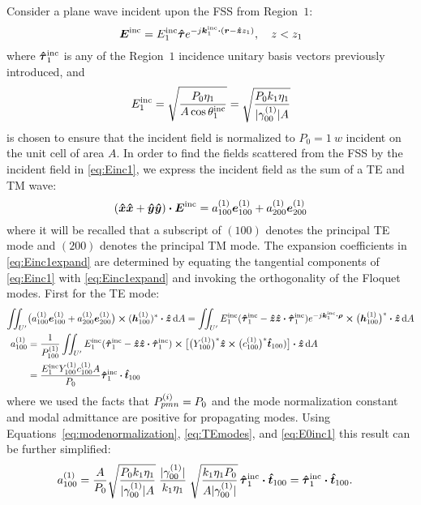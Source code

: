 Consider a plane wave incident upon the FSS from Region~$1$:
\begin{equation}
  \E\inc = E_1\inc \tauhat e^{-j\k_1\inc \bdot (\r - \z z_1)}, \quad z<z_1
  \label{eq:Einc1}
\end{equation}
where $\tauhat_1\inc$ is any of the Region~$1$ incidence unitary basis vectors previously introduced, and
\begin{equation}
  \label{eq:E0inc1}
  E_1^{\text{inc}} = \sqrt{\frac{P_0 \eta_1}{A \cos\theta_1^{\text{inc}}} } = \sqrt{\frac{P_0 k_1\eta_1}{\lvert\gamma_{00}^{(1)}\rvert A}}
\end{equation}
is chosen to ensure that the incident field is normalized to $P_0 = \SI{1}{w}$ incident on the unit
cell of area $A$.
In order to find the fields scattered from the FSS by the incident
field in \eqref{eq:Einc1}, we express the incident field as the sum of
a TE and TM wave:
\begin{equation}
  (\boldsymbol{\hat{x}}\boldsymbol{\hat{x}}+\boldsymbol{\hat{y}}\boldsymbol{\hat{y}}) \boldsymbol{\cdot} \boldsymbol{E}^{\text{inc}} = a_{100}^{(1)} \boldsymbol{e}^{(1)}_{100} + a_{200}^{(1)} \boldsymbol{e}^{(1)}_{200}
  \label{eq:Einc1expand}
\end{equation}
where it will be recalled that a subscript of $(100)$ denotes the
principal TE mode and $(200)$ denotes the principal TM mode.
The expansion coefficients in \eqref{eq:Einc1expand} are determined
by equating the tangential components of \eqref{eq:Einc1} with \eqref{eq:Einc1expand} and
invoking the orthogonality of the Floquet modes.  First for the TE mode:
\begin{align}
  \iint_{U'} & \bigl(a_{100}\one \e\one_{100} + a_{200}\one \e\one_{200}\bigr) \cross
  (\h\one_{100})^* \bdot \z \, \d A 
  =
  \iint_{U'} E_1\inc (\tauhat_1\inc - \z\z\bdot\tauhat_1\inc) e^{-j\k_1\inc \bdot \vecrho} \cross
  \bigl(\h\one_{100}\bigr)^* \bdot \z \, \d A \nonumber \\
   a\one_{100} &= \frac{1}{P\one_{100}}
  \iint_{U'} E_1\inc (\tauhat_1\inc - \z\z\bdot\tauhat_1\inc) \cross 
  \bigl[
    \bigl(Y\one_{100}\bigr)^* 
    \z \cross \bigl(c\one_{100}\bigr)^* \t_{100})
                            \bigr] \bdot \z \, \d A  \nonumber \\
  &= \frac{E_1\inc Y\one_{100} c\one_{100} A}{P_0}
  \tauhat_1\inc \bdot \t_{100}
\end{align}
where we used the facts that $P_{pmn}^{(i)} = P_0$ and the mode normalization constant and modal admittance are positive
for propagating modes. 
Using Equations~\eqref{eq:modenormalization}, \eqref{eq:TEmodes}, and \eqref{eq:E0inc1} this result
can be further simplified:
\begin{align}
  a\one_{100} &= \frac{A}{P_0} \sqrt{\frac{P_0 k_1\eta_1}{\abs{\gamma_{00}\one} A}} %
                \; \frac{\abs{\gamma_{00}\one}}{k_1\eta_1} %
                \; \sqrt{\frac{k_1\eta_1P_0}{A \abs{\gamma_{00}\one}}} %
                \,   \tauhat_1\inc \bdot \t_{100} = \tauhat_1\inc \bdot \t_{100}. 
\end{align}


